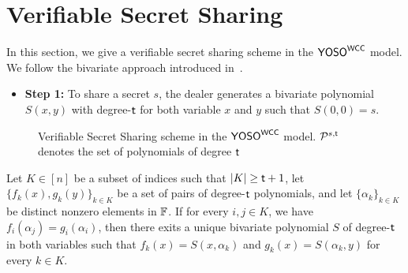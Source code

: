 \section{Verifiable Secret Sharing}

In this section, we give a verifiable secret sharing scheme in the $\mathsf{YOSO}^{\mathsf{WCC}}$ model. We follow the bivariate approach introduced in~\cite{STOC:BenGolWig88}. 

\begin{itemize}
    \item \textbf{Step 1:} To share a secret $s$, the dealer generates a bivariate polynomial $S(x,y)$ with degree-$\mathsf{t}$ for both variable $x$ and $y$ such that $S(0,0) = s$.
\end{itemize}

\begin{figure}[ht!]%
	\centering%
	\nicoresetlinenr
	\caption{Verifiable Secret Sharing scheme in the $\mathsf{YOSO}^{\mathsf{WCC}}$ model. $\mathcal{P}^{s, \mathsf{t}}$ denotes the set of polynomials of degree $\mathsf{t}$}
	\label{simple-figure}
\end{figure}

\begin{lemma}
    Let $K \in [n]$ be a subset of indices such that $|K| \geq \mathsf{t}+1$, let $\{f_k(x), g_k(y)\}_{k \in K}$ be a set of pairs of degree-$\mathsf{t}$ polynomials, and let $\{\alpha_k\}_{k\in K}$ be distinct nonzero elements in $\mathbb{F}$. If for every $i,j \in K$, we have $f_i(\alpha_j) = g_i(\alpha_i)$, then  there exits a unique bivariate polynomial $S$ of degree-$\mathsf{t}$ in both variables such that $f_k(x) = S(x, \alpha_k)$ and $g_k(x) = S(\alpha_k, y)$ for every $k \in K$.
\end{lemma}

